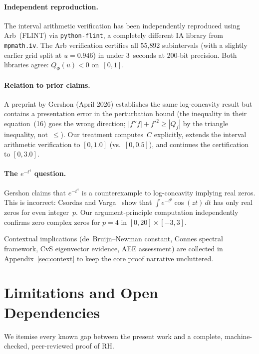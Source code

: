 \documentclass[11pt]{article}
\theoremstyle{definition}
\theoremstyle{remark}
\begin{document}
\paragraph{Independent reproduction.} The interval arithmetic verification has been independently reproduced using Arb~(FLINT) via \texttt{python-flint}, a completely different IA library from \texttt{mpmath.iv}. The Arb verification certifies all 55{,}892 subintervals (with a slightly earlier grid split at $u = 0.946$) in under 3~seconds at 200-bit precision. Both libraries agree: $Q_\Phi(u) < 0$ on~$[0,1]$.

\paragraph{Relation to prior claims.} A preprint by Gershon (April 2026) establishes the same log-concavity result but contains a presentation error in the perturbation bound (the inequality in their equation~(16) goes the wrong direction; $|f''f| + f'^2 \geq |Q_f|$ by the triangle inequality, not~$\leq$). Our treatment computes~$C$ explicitly, extends the interval arithmetic verification to $[0, 1.0]$ (vs.\ $[0, 0.5]$), and continues the certification to $[0, 3.0]$.

\paragraph{The $e^{-t^4}$ question.} Gershon claims that $e^{-t^4}$ is a counterexample to log-concavity implying real zeros. This is incorrect: Csordas and Varga~\cite[\S2, Example~2.1]{csordas1989} show that $\int e^{-t^p}\cos(zt)\,dt$ has only real zeros for even integer~$p$. Our argument-principle computation independently confirms zero complex zeros for $p=4$ in $[0,20] \times [-3,3]$.

Contextual implications (de~Bruijn--Newman constant, Connes spectral framework, CvS eigenvector evidence, AEE assessment) are collected in Appendix~\ref{sec:context} to keep the core proof narrative uncluttered.

\section{Limitations and Open Dependencies}\label{sec:limitations}

We itemise every known gap between the present work and a complete, machine-checked, peer-reviewed proof of RH.
\end{document}
